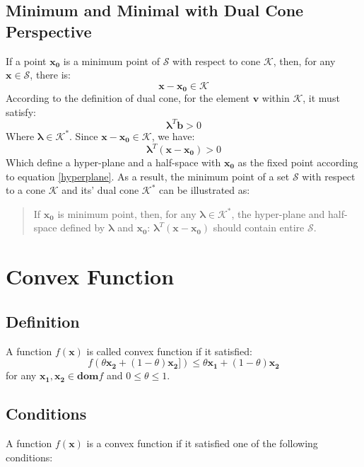 \documentclass[10pt,a4paper]{article}
\begin{document}
\subsection{Minimum and Minimal with Dual Cone Perspective}
If a point $\mathbf{x_{0}}$ is a minimum point of $\mathcal{S}$ with respect to cone $\mathcal{K}$, then, for any $\mathbf{x} \in \mathcal{S}$, there is:
\begin{equation*}
	\mathbf{x} - \mathbf{x_{0}} \in \mathcal{K}
\end{equation*}
According to the definition of dual cone, for the element $\mathbf{v}$ within $\mathcal{K}$, it must satisfy:
\begin{equation*}
	\mathbf{\lambda}^{T} \mathbf{b} > 0
\end{equation*}
Where $\mathbf{\lambda} \in \mathcal{K}^{*}$. Since $\mathbf{x} - \mathbf{x_{0}} \in \mathcal{K}$, we have:
\begin{equation*}
	\mathbf{\lambda}^{T} (\mathbf{x} - \mathbf{x_{0}}) > 0
\end{equation*}
Which define a hyper-plane and a half-space with $\mathbf{x_{0}}$ as the fixed point according to equation \ref{hyperplane}. As a result, the minimum point of a set $\mathcal{S}$ with respect to a cone $\mathcal{K}$ and its' dual cone $\mathcal{K}^{*}$ can be illustrated as:
\begin{quote}
	If $\mathbf{x_{0}}$ is minimum point, then, for any $\mathbf{\lambda} \in \mathcal{K}^{*}$, the hyper-plane and half-space defined by $\mathbf{\lambda}$ and $\mathbf{x_{0}}$: $\mathbf{\lambda}^{T} (\mathbf{x} - \mathbf{x_{0}})$ should contain entire $\mathcal{S}$.
\end{quote}

\section{Convex Function}

\subsection{Definition}
A function $f(\mathbf{x})$ is called convex function if it satisfied:
\begin{equation}
	f(\theta \mathbf{x_{2}} + (1 - \theta) \mathbf{x_{2}]}) \leq \theta \mathbf{x_{1}} + (1 - \theta) \mathbf{x_{2}}
\end{equation}
for any $\mathbf{x_{1}}, \mathbf{x_{2}} \in \mathbf{dom} f$ and $0 \leq \theta \leq 1$.

\subsection{Conditions}
A function $f(\mathbf{x})$ is a convex function if it satisfied one of the following conditions:
\end{document}
